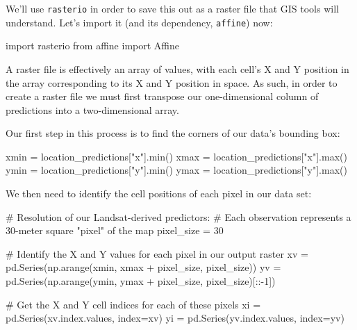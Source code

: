 \documentclass[
  letterpaper,
  DIV=11,
  numbers=noendperiod]{scrartcl}
\newenvironment{Shaded}{\begin{snugshade}}{\end{snugshade}}
\newcommand{\BuiltInTok}[1]{\textcolor[rgb]{0.00,0.23,0.31}{#1}}
\newcommand{\CommentTok}[1]{\textcolor[rgb]{0.37,0.37,0.37}{#1}}
\newcommand{\DecValTok}[1]{\textcolor[rgb]{0.68,0.00,0.00}{#1}}
\newcommand{\ImportTok}[1]{\textcolor[rgb]{0.00,0.46,0.62}{#1}}
\newcommand{\NormalTok}[1]{\textcolor[rgb]{0.00,0.23,0.31}{#1}}
\newcommand{\OperatorTok}[1]{\textcolor[rgb]{0.37,0.37,0.37}{#1}}
\newcommand{\StringTok}[1]{\textcolor[rgb]{0.13,0.47,0.30}{#1}}
\begin{document}
We'll use \texttt{rasterio} in order to save this out as a raster file
that GIS tools will understand. Let's import it (and its dependency,
\texttt{affine}) now:

\begin{Shaded}
\begin{Highlighting}[]
\ImportTok{import}\NormalTok{ rasterio}
\ImportTok{from}\NormalTok{ affine }\ImportTok{import}\NormalTok{ Affine}
\end{Highlighting}
\end{Shaded}

A raster file is effectively an array of values, with each cell's X and
Y position in the array corresponding to its X and Y position in space.
As such, in order to create a raster file we must first transpose our
one-dimensional column of predictions into a two-dimensional array.

Our first step in this process is to find the corners of our data's
bounding box:

\begin{Shaded}
\begin{Highlighting}[]
\NormalTok{xmin }\OperatorTok{=}\NormalTok{ location\_predictions[}\StringTok{"x"}\NormalTok{].}\BuiltInTok{min}\NormalTok{()}
\NormalTok{xmax }\OperatorTok{=}\NormalTok{ location\_predictions[}\StringTok{"x"}\NormalTok{].}\BuiltInTok{max}\NormalTok{()}
\NormalTok{ymin }\OperatorTok{=}\NormalTok{ location\_predictions[}\StringTok{"y"}\NormalTok{].}\BuiltInTok{min}\NormalTok{()}
\NormalTok{ymax }\OperatorTok{=}\NormalTok{ location\_predictions[}\StringTok{"y"}\NormalTok{].}\BuiltInTok{max}\NormalTok{()}
\end{Highlighting}
\end{Shaded}

We then need to identify the cell positions of each pixel in our data
set:

\begin{Shaded}
\begin{Highlighting}[]
\CommentTok{\# Resolution of our Landsat{-}derived predictors:}
\CommentTok{\# Each observation represents a 30{-}meter square "pixel" of the map}
\NormalTok{pixel\_size }\OperatorTok{=} \DecValTok{30}

\CommentTok{\# Identify the X and Y values for each pixel in our output raster}
\NormalTok{xv }\OperatorTok{=}\NormalTok{ pd.Series(np.arange(xmin, xmax }\OperatorTok{+}\NormalTok{ pixel\_size, pixel\_size))}
\NormalTok{yv }\OperatorTok{=}\NormalTok{ pd.Series(np.arange(ymin, ymax }\OperatorTok{+}\NormalTok{ pixel\_size, pixel\_size)[::}\OperatorTok{{-}}\DecValTok{1}\NormalTok{])}

\CommentTok{\# Get the X and Y cell indices for each of these pixels}
\NormalTok{xi }\OperatorTok{=}\NormalTok{ pd.Series(xv.index.values, index}\OperatorTok{=}\NormalTok{xv)}
\NormalTok{yi }\OperatorTok{=}\NormalTok{ pd.Series(yv.index.values, index}\OperatorTok{=}\NormalTok{yv)}
\end{Highlighting}
\end{Shaded}
\end{document}

